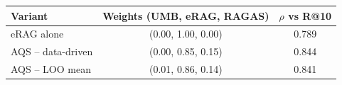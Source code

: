 \begin{tabular}{lcc}
\toprule
Variant & Weights (UMB, eRAG, RAGAS) & $\rho$ vs R@10 \\
\midrule
eRAG alone & (0.00, 1.00, 0.00) & 0.789 \\
AQS -- data-driven & (0.00, 0.85, 0.15) & 0.844 \\
AQS -- LOO mean & (0.01, 0.86, 0.14) & 0.841 \\
\bottomrule
\end{tabular}
